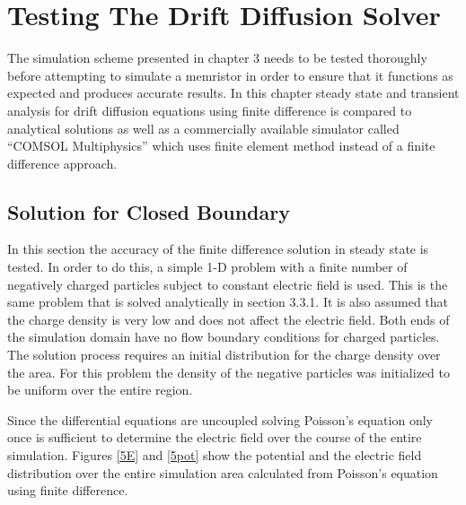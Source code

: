 \chapter{Testing The Drift Diffusion Solver} %

\label{Chapter5} %


\begin{doublespace}

 The simulation scheme presented in chapter 3 needs to be tested thoroughly before attempting to simulate a memristor in order to ensure that it functions as expected and produces accurate results. In this chapter steady state and transient analysis for drift diffusion equations using finite difference is compared to analytical solutions as well as a commercially available simulator called ``COMSOL Multiphysics'' \tjs{}\cite{Comsol} which uses  finite element method instead of a finite difference approach.

\section{Solution for Closed Boundary}
In this section the accuracy of the finite difference solution in steady state is tested. In order to do this, a simple 1-D problem with a finite number of negatively charged particles  subject to constant electric field is used. This is the same problem that is solved analytically in section 3.3.1. It is also assumed that the charge density is very low and does not affect the electric field. Both ends of the simulation domain have no flow boundary conditions for charged particles. The solution process requires an initial distribution for the charge density over the area. For this problem the density of the negative particles was initialized to be uniform over the entire region. 

Since the differential equations are uncoupled solving Poisson's equation only once is sufficient to determine the electric field over the course of the entire simulation. Figures \ref{5E} and \ref{5pot} show the potential and the electric field distribution over the entire simulation area calculated from Poisson's equation using finite difference. 


\end{doublespace}
